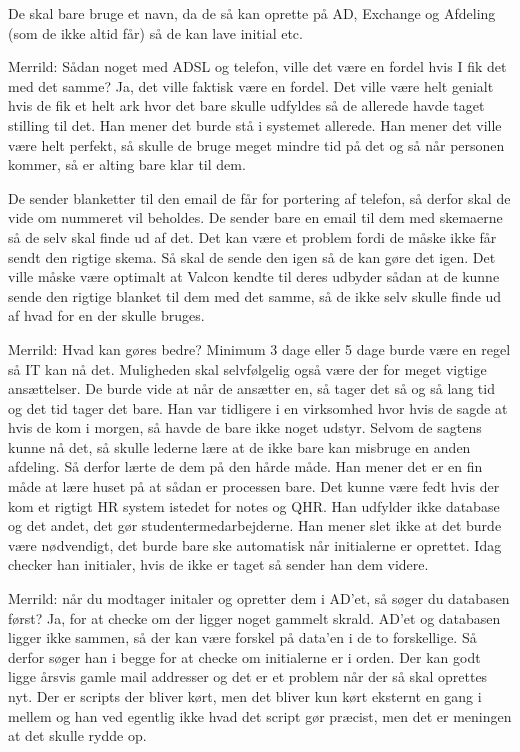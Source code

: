 \begin{linenumbers*}
De skal bare bruge et navn, da de så kan oprette på AD, Exchange og Afdeling (som de ikke altid får) så de kan lave initial etc.

Merrild: Sådan noget med ADSL og telefon, ville det være en fordel hvis I fik det med det samme?
Ja, det ville faktisk være en fordel. Det ville være helt genialt hvis de fik et helt ark hvor det bare skulle udfyldes så de allerede havde taget stilling til det. Han mener det burde stå i systemet allerede. Han mener det ville være helt perfekt, så skulle de bruge meget mindre tid på det og så når personen kommer, så er alting bare klar til dem. 

De sender blanketter til den email de får for portering af telefon, så derfor skal de vide om nummeret vil beholdes. De sender bare en email til dem med skemaerne så de selv skal finde ud af det. Det kan være et problem fordi de måske ikke får sendt den rigtige skema. Så skal de sende den igen så de kan gøre det igen. Det ville måske være optimalt at Valcon kendte til deres udbyder sådan at de kunne sende den rigtige blanket til dem med det samme, så de ikke selv skulle finde ud af hvad for en der skulle bruges.

Merrild: Hvad kan gøres bedre?
Minimum 3 dage eller 5 dage burde være en regel så IT kan nå det. Muligheden skal selvfølgelig også være der for meget vigtige ansættelser.  De burde vide at når de ansætter en, så tager det så og så lang tid og det tid tager det bare. Han var tidligere i en virksomhed hvor hvis de sagde at hvis de kom i morgen, så havde de bare ikke noget udstyr.  Selvom de sagtens kunne nå det, så skulle lederne lære at de ikke bare kan misbruge en anden afdeling. Så derfor lærte de dem på den hårde måde. Han mener det er en fin måde at lære huset på at sådan er processen bare. Det kunne være fedt hvis der kom et rigtigt HR system istedet for notes og QHR. Han udfylder ikke database og det andet, det gør studentermedarbejderne. Han mener slet ikke at det burde være nødvendigt, det burde bare ske automatisk når initialerne er oprettet. 
Idag checker han initialer, hvis de ikke er taget så sender han dem videre. 

Merrild: når du modtager initaler og opretter dem i AD’et, så søger du databasen først?
Ja, for at checke om der ligger noget gammelt skrald. AD’et og databasen ligger ikke sammen, så der kan være forskel på data’en i de to forskellige. Så derfor søger han i begge for at checke om initialerne er i orden. Der kan godt ligge årsvis gamle mail addresser og det er et problem når der så skal oprettes nyt. Der er scripts der bliver kørt, men det bliver kun kørt eksternt en gang i mellem og han ved egentlig ikke hvad det script gør præcist, men det er meningen at det skulle rydde op.


\end{linenumbers*}
